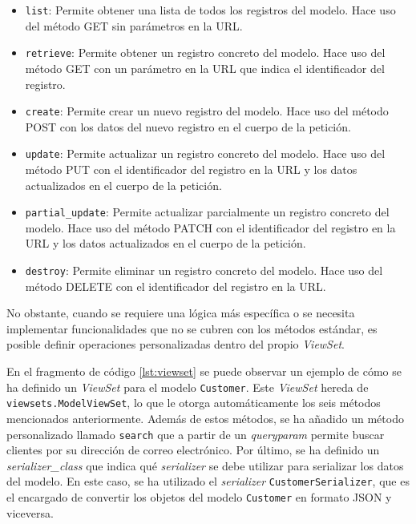 \begin{itemize}
    \item \texttt{list}: Permite obtener una lista de todos los registros del modelo. Hace uso del método GET sin parámetros en la URL.
    \item \texttt{retrieve}: Permite obtener un registro concreto del modelo. Hace uso del método GET con un parámetro en la URL que indica el identificador del registro.
    \item \texttt{create}: Permite crear un nuevo registro del modelo. Hace uso del método POST con los datos del nuevo registro en el cuerpo de la petición.
    \item \texttt{update}: Permite actualizar un registro concreto del modelo. Hace uso del método PUT con el identificador del registro en la URL y los datos actualizados en el cuerpo de la petición.
    \item \texttt{partial\_update}: Permite actualizar parcialmente un registro concreto del modelo. Hace uso del método PATCH con el identificador del registro en la URL y los datos actualizados en el cuerpo de la petición.
    \item \texttt{destroy}: Permite eliminar un registro concreto del modelo. Hace uso del método DELETE con el identificador del registro en la URL.
\end{itemize}

No obstante, cuando se requiere una lógica más específica o se necesita implementar funcionalidades que no se cubren con los métodos estándar, es posible definir operaciones personalizadas dentro del propio \textit{ViewSet}.

En el fragmento de código \ref{lst:viewset} se puede observar un ejemplo de cómo se ha definido un \textit{ViewSet} para el modelo \texttt{Customer}. Este \textit{ViewSet} hereda de \texttt{viewsets.ModelViewSet}, lo que le otorga automáticamente los seis métodos mencionados anteriormente. Además de estos métodos, se ha añadido un método personalizado llamado \texttt{search} que a partir de un \textit{queryparam} permite buscar clientes por su dirección de correo electrónico. Por último, se ha definido un \textit{serializer\_class} que indica qué \textit{serializer} se debe utilizar para serializar los datos del modelo. En este caso, se ha utilizado el \textit{serializer} \texttt{CustomerSerializer}, que es el encargado de convertir los objetos del modelo \texttt{Customer} en formato JSON y viceversa.

\begin{center}
    \begin{minipage}{0.8\textwidth}
        
    \end{minipage}
\end{center}

